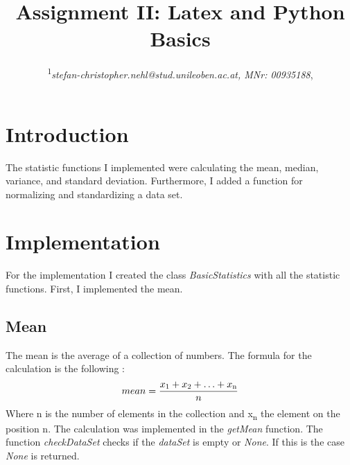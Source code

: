 \documentclass[10pt, a4paper, twocolumn]{article} %
\title{Assignment II: Latex and Python Basics} %
\author{
	\coursetitle{Exercises in Machine Learning (190.013), SS2022}
	\authorstyle{Stefan Nehl\textsuperscript{1}} %
	\newline\newline %
	\textsuperscript{1}\textit{stefan-christopher.nehl@stud.unileoben.ac.at, MNr: 00935188}, \institution{Montanuniversität Leoben, Austria}\\ %
	\newline\submissiondate{\today} %
}
\begin{document}

\maketitle %

\thispagestyle{firstpage} %




\section{Introduction}

The statistic functions I implemented were calculating the mean, median, variance, and standard deviation. Furthermore, I added a function for normalizing and standardizing a data set.  

\section{Implementation}
For the implementation I created the class \textit{BasicStatistics} with all the statistic functions. First, I implemented the mean. 

\subsection{Mean}
The mean is the average of a collection of numbers. The formula for the calculation is the following
\citep{meanCFI}: 
\[
mean = \frac{x\textsubscript{1} + x\textsubscript{2} + \ldots + x\textsubscript{n}} {n}
\]
Where n is the number of elements in the collection and x\textsubscript{n} the element on the position n. The calculation was implemented in the \textit{getMean} function. 
The function \textit{checkDataSet} checks if the \textit{dataSet} is empty or \textit{None}. If this is the case \textit{None} is returned.

\end{document}
